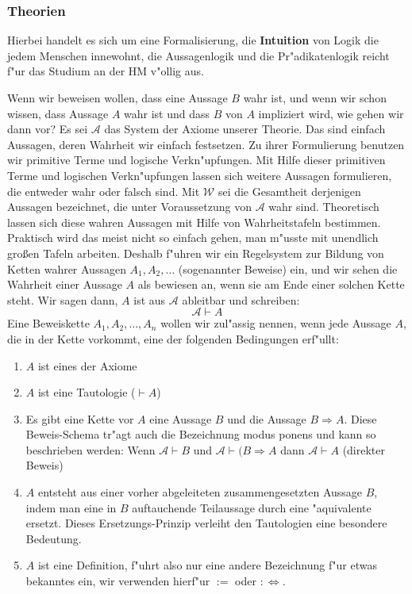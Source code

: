 \subsubsection*{Theorien}
Hierbei handelt es sich um eine Formalisierung, die \textbf{Intuition} von Logik die jedem Menschen innewohnt, die Aussagenlogik und die Pr"adikatenlogik reicht f"ur das Studium an der HM v"ollig aus. 

Wenn wir beweisen wollen, dass eine Aussage $B$ wahr ist, und wenn wir schon wissen, dass Aussage $A$ wahr ist und dass $B$ von $A$ impliziert wird, wie gehen wir dann vor? Es sei $\mathcal{A}$ das System der Axiome unserer Theorie. Das sind einfach Aussagen, deren Wahrheit wir einfach festsetzen. Zu ihrer Formulierung benutzen wir primitive Terme und logische Verkn"upfungen. Mit Hilfe dieser primitiven Terme und logischen Verkn"upfungen lassen sich weitere Aussagen formulieren, die entweder wahr oder falsch sind. Mit $\mathcal{W}$ sei die Gesamtheit derjenigen Aussagen bezeichnet, die unter Voraussetzung von $\mathcal{A}$ wahr sind. Theoretisch lassen sich diese wahren Aussagen mit Hilfe von Wahrheitstafeln bestimmen. Praktisch wird das meist nicht so einfach gehen, man m"usste mit unendlich gro{\ss}en Tafeln arbeiten. Deshalb f"uhren wir ein Regelsystem zur Bildung von Ketten wahrer Aussagen $A_1, A_2, \ldots$ (sogenannter Beweise) ein, und wir sehen die Wahrheit einer Aussage $A$ als bewiesen an, wenn sie am Ende einer solchen Kette steht. Wir sagen dann, $A$ ist aus $\mathcal{A}$ ableitbar und schreiben:
\begin{equation*}
 \mathcal{A} \vdash A
\end{equation*}
Eine Beweiskette $A_1, A_2, \ldots, A_n$ wollen wir zul"assig nennen, wenn jede Aussage $A$, die in der Kette vorkommt, eine der folgenden Bedingungen erf"ullt:
\begin{enumerate}
\item $A$ ist eines der Axiome
\item $A$ ist eine Tautologie ($\vdash A$)
\item Es gibt eine Kette vor $A$ eine Aussage $B$ und die Aussage $B \Rightarrow A$. Diese Beweis-Schema tr"agt auch die Bezeichnung modus ponens und kann so beschrieben werden:
Wenn $\mathcal{A} \vdash B$ und $\mathcal{A} \vdash (B \Rightarrow A$ dann $\mathcal{A} \vdash A$ (direkter Beweis)
\item $A$ entsteht aus einer vorher abgeleiteten zusammengesetzten Aussage $B$, indem man eine in $B$ auftauchende Teilaussage durch eine "aquivalente ersetzt. Dieses Ersetzungs-Prinzip verleiht den Tautologien eine besondere Bedeutung.
\item $A$ ist eine Definition, f"uhrt also nur eine andere Bezeichnung f"ur etwas bekanntes ein, wir verwenden hierf"ur $:=$ oder $:\iff$.
\end{enumerate}

